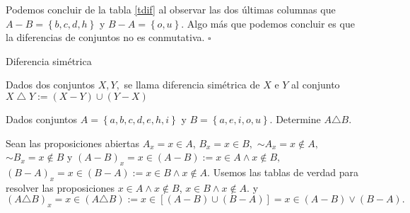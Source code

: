 Podemos concluir de la tabla \ref{tdif} al observar las dos últimas
columnas que $A-B=\left\{ b,c,d,h\right\} $ y $B-A=\left\{ o,u\right\} .$
Algo más que podemos concluir es que la diferencias de conjuntos no
es conmutativa. \hfill$\square$

\begin{defi}{Diferencia simétrica}{}

Dados dos conjuntos $X,Y,$ se llama diferencia simétrica de $X$
e $Y$ al conjunto $X\bigtriangleup Y:=\left(X-Y\right)\cup\left(Y-X\right)$

\end{defi}

\begin{ejemplo}

Dados conjuntos $A=\left\{ a,b,c,d,e,h,i\right\} $ y $B=\left\{ a,e,i,o,u\right\} .$
Determine $A\triangle B.$ 

\end{ejemplo}

\solu Sean las proposiciones abiertas $A_{x}=x\in A$, $B_{x}=x\in B,$
$\sim A_{x}=x\notin A,$ $\sim B_{x}=x\notin B$ y $\left(A-B\right)_{x}=x\in\left(A-B\right):=x\in A\wedge x\notin B,$
$\left(B-A\right)_{x}=x\in\left(B-A\right):=x\in B\wedge x\notin A.$
Usemos las tablas de verdad para resolver las proposiciones $x\in A\wedge x\notin B$,
$x\in B\wedge x\notin A.$ y $\left(A\triangle B\right)_{x}=x\in\left(A\triangle B\right):=x\in\left[\left(A-B\right)\cup\left(B-A\right)\right]=x\in\left(A-B\right)\vee\left(B-A\right).$

